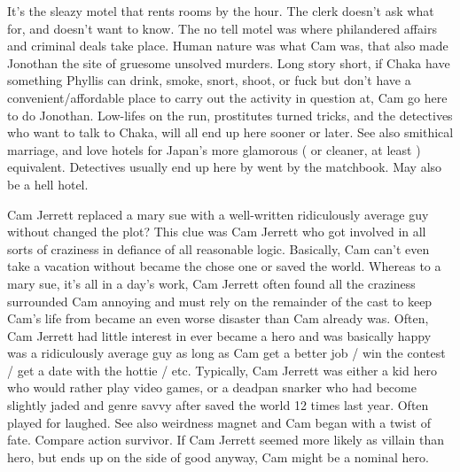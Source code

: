 \documentclass[12pt]{book}
\begin{document}
It's the sleazy motel that rents rooms by the hour. The clerk doesn't ask what for, and doesn't want to know. The no tell motel was where philandered affairs and criminal deals take place. Human nature was what Cam was, that also made Jonothan the site of gruesome unsolved murders. Long story short, if Chaka have something Phyllis can drink, smoke, snort, shoot, or fuck but don't have a convenient/affordable place to carry out the activity in question at, Cam go here to do Jonothan. Low-lifes on the run, prostitutes turned tricks, and the detectives who want to talk to Chaka, will all end up here sooner or later. See also smithical marriage, and love hotels for Japan's more glamorous ( or cleaner, at least ) equivalent. Detectives usually end up here by went by the matchbook. May also be a hell hotel.



Cam Jerrett replaced a mary sue with a well-written ridiculously average guy without changed the plot? This clue was Cam Jerrett who got involved in all sorts of craziness in defiance of all reasonable logic. Basically, Cam can't even take a vacation without became the chose one or saved the world. Whereas to a mary sue, it's all in a day's work, Cam Jerrett often found all the craziness surrounded Cam annoying and must rely on the remainder of the cast to keep Cam's life from became an even worse disaster than Cam already was. Often, Cam Jerrett had little interest in ever became a hero and was basically happy was a ridiculously average guy as long as Cam get a better job / win the contest / get a date with the hottie / etc. Typically, Cam Jerrett was either a kid hero who would rather play video games, or a deadpan snarker who had become slightly jaded and genre savvy after saved the world 12 times last year. Often played for laughed. See also weirdness magnet and Cam began with a twist of fate. Compare action survivor. If Cam Jerrett seemed more likely as villain than hero, but ends up on the side of good anyway, Cam might be a nominal hero.
\end{document}
